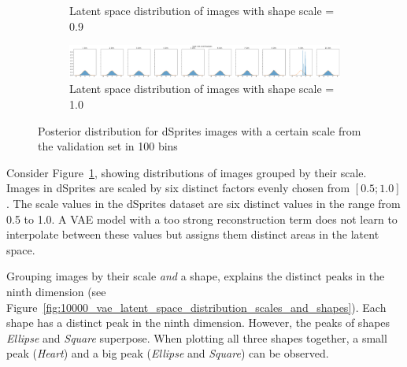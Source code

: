 \begin{figure}
\begin{subfigure}{\textwidth}
        \caption{Latent space distribution of images with shape scale = 0.9}
    \end{subfigure}
    \begin{subfigure}{\textwidth}
        \centering
        \includegraphics[width=\textwidth]{images/latent_space_entanglement/vae_dsprites_lf_10000_dist_scale_1_0.png}
        \caption{Latent space distribution of images with shape scale = 1.0}
    \end{subfigure}
    \caption[VAE Latent Space Distribution - dSprites Scales]{Posterior distribution for dSprites images with a certain scale from the validation set in 100 bins}
    \label{fig:10000_vae_latent_space_distribution_scales}
\end{figure}

Consider Figure~\ref{fig:10000_vae_latent_space_distribution_scales}, showing distributions of images grouped by their scale.
Images in dSprites are scaled by six distinct factors evenly chosen from $[0.5; 1.0]$.
The scale values in the dSprites dataset are six distinct values in the range from 0.5 to 1.0.
A \ac{VAE} model with a too strong reconstruction term does not learn to interpolate between these values but assigns them distinct areas in the latent space.

Grouping images by their scale \textit{and} a shape, explains the distinct peaks in the ninth dimension (see Figure~\ref{fig:10000_vae_latent_space_distribution_scales_and_shapes}).
Each shape has a distinct peak in the ninth dimension.
However, the peaks of shapes \textit{Ellipse} and \textit{Square} superpose.
When plotting all three shapes together, a small peak (\textit{Heart}) and a big peak (\textit{Ellipse} and \textit{Square}) can be observed.

